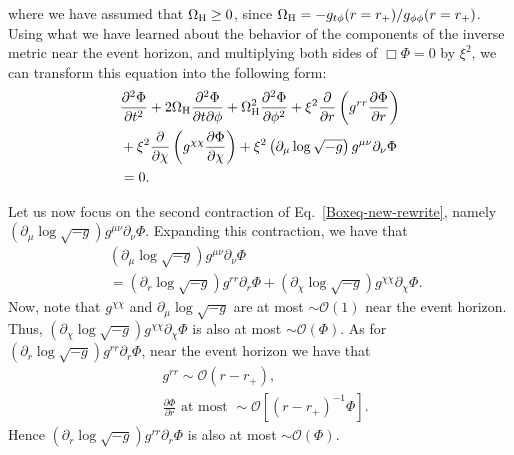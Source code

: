 \documentclass[aps,prx,amsmath,floats,floatfix,twocolumn,
  superscriptaddress,nofootinbib,showpacs]{revtex4-1}
\begin{document}
where we have assumed that $\Omega_{\rm H} \geq 0 $, since $\Omega_{\rm H} = - g_{t \phi}(r=r_+) / g_{\phi \phi}(r=r_+) $. 
Using what we have learned about the behavior of the components of the inverse metric near the event horizon, and multiplying both sides of $\Box \Phi = 0$ by $\xi^2$, we can transform this equation into the following form: 
\begin{equation}
\begin{split}
& \frac{\partial^2 \Phi}{\partial t^2} + 2 \Omega_{\rm H} \frac{\partial^2 \Phi}{\partial t \partial \phi}  + \Omega_{\rm H}^2 \frac{\partial^2 \Phi}{\partial \phi^2} + \xi^2 \frac{\partial}{\partial r} \left( g^{rr} \frac{\partial \Phi}{\partial r} \right) \\
& + \xi^2 \frac{\partial}{\partial \chi} \left( g^{\chi \chi} \frac{\partial \Phi}{\partial \chi} \right) + \xi^2 \left( \partial_{\mu} \log \sqrt{-g} \right) g^{\mu \nu} \partial_{\nu} \Phi \\
& = 0. 
\end{split}
\end{equation}

Let us now focus on the second contraction of Eq.~\eqref{Boxeq-new-rewrite}, namely $\left( \partial_{\mu} \log \sqrt{-g} \right) g^{\mu \nu} \partial_{\nu} \Phi$. Expanding this contraction, we have that
\begin{equation}
\begin{split}
& \left( \partial_{\mu} \log \sqrt{-g} \right) g^{\mu \nu} \partial_{\nu} \Phi \\
& = \left( \partial_{r} \log \sqrt{-g} \right) g^{r r} \partial_{r} \Phi + \left( \partial_{\chi} \log \sqrt{-g} \right) g^{\chi \chi} \partial_{\chi} \Phi. 
\end{split}
\end{equation}
Now, note that $ g^{\chi \chi} $ and $\partial_{\mu} \log \sqrt{-g}$ are at most $\sim \mathcal{O}(1)$ near the event horizon.  
Thus, $\left( \partial_{\chi} \log \sqrt{-g} \right) g^{\chi \chi} \partial_{\chi} \Phi$ is also at most $\sim \mathcal{O}(\Phi)$. 
As for $\left( \partial_{r} \log \sqrt{-g} \right) g^{r r} \partial_{r} \Phi$, near the event horizon we have that 
\begin{equation}
\begin{split}
& g^{r r} \sim \mathcal{O}(r-r_+), \\
& \frac{\partial \Phi}{\partial r} \text{ at most } \sim \mathcal{O}\left[ (r-r_+)^{-1} \Phi \right]. 
\end{split}
\end{equation}
Hence $\left( \partial_{r} \log \sqrt{-g} \right) g^{r r} \partial_{r} \Phi$ is also at most $\sim \mathcal{O}(\Phi)$.
\end{document}
